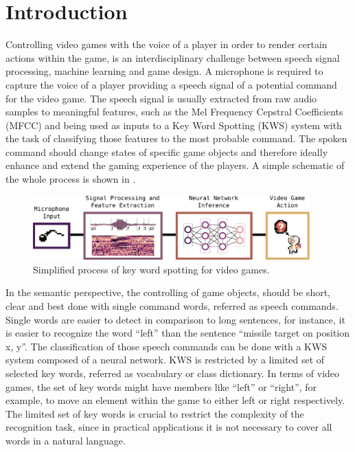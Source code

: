 
\chapter{Introduction}\label{sec:intro}
Controlling video games with the voice of a player in order to render certain actions within the game, is an interdisciplinary challenge between speech signal processing, machine learning and game design.
A microphone is required to capture the voice of a player providing a speech signal of a potential command for the video game.
The speech signal is usually extracted from raw audio samples to meaningful features, such as the Mel Frequency Cepstral Coefficients (MFCC) and being used as inputs to a Key Word Spotting (KWS) system with the task of classifying those features to the most probable command.
The spoken command should change states of specific game objects and therefore ideally enhance and extend the gaming experience of the players.
A simple schematic of the whole process is shown in .
\begin{figure}[!ht]
  \centering
    \includegraphics[width=0.95\textwidth]{./1_intro/figs/intro_kws.pdf}
  \caption{Simplified process of key word spotting for video games.}
  \label{fig:intro_kws}
\end{figure}
\FloatBarrier
\noindent
In the semantic perspective, the controlling of game objects, should be short, clear and best done with single command words, referred as speech commands.
Single words are easier to detect in comparison to long sentences, for instance, it is easier to recognize the word \enquote{left} than the sentence \enquote{missile target on position x, y}.
The classification of those speech commands can be done with a KWS system composed of a neural network.
KWS is restricted by a limited set of selected key words, referred as vocabulary or class dictionary.
In terms of video games, the set of key words might have members like \enquote{left} or \enquote{right}, for example, to move an element within the game to either left or right respectively.
The limited set of key words is crucial to restrict the complexity of the recognition task, since in practical applications it is not necessary to cover all words in a natural language.
